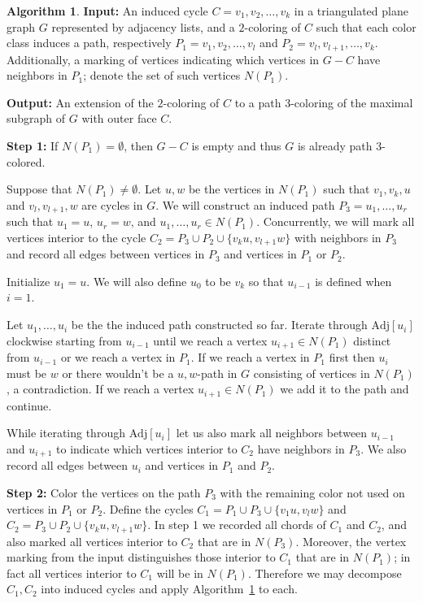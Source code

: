 \documentclass[12pt,letterpaper]{article}
\theoremstyle{plain}
\theoremstyle{definition}
\theoremstyle{break}
\newtheorem{algorithm}[lemma]{Algorithm}     %
\begin{document}
\begin{algorithm}\label{A:poh_linear}
\textbf{Input:} An induced cycle $C=v_1,v_2,\ldots,v_k$ in a triangulated plane
graph $G$ represented by adjacency lists, and a $2$-coloring of $C$ such
that each color class induces a path, respectively $P_1=v_1,v_2,\ldots,v_l$ and
$P_2=v_l,v_{l+1},\ldots,v_k$. Additionally, a marking of vertices indicating which
vertices in $G-C$ have neighbors in $P_1$; denote the set of such vertices
$N(P_1)$.

\noindent\textbf{Output:} An extension of the $2$-coloring of $C$ to a path
$3$-coloring of the maximal subgraph of $G$ with outer face $C$.

\noindent\textbf{Step 1:} If $N(P_1)=\emptyset$, then $G-C$ is empty and thus $G$ is
already path $3$-colored.
    
Suppose that $N(P_1)\ne\emptyset$. Let $u,w$ be the vertices in $N(P_1)$ such that $v_1, v_k, u$
and $v_l,v_{l+1}, w$ are
cycles in $G$. We will construct
an induced path $P_3=u_1,\ldots,u_r$ such that $u_1=u$, $u_r=w$, and $u_1,\ldots,u_r\in
N(P_1)$. Concurrently, we will
mark all vertices interior to the cycle $C_2=P_3\cup P_2\cup\{v_ku,v_{l+1}w\}$
with neighbors in $P_3$ and record all
edges between vertices in $P_3$ and vertices in $P_1$ or $P_2$.

Initialize $u_1=u$. We will also define $u_0$ to be $v_k$ so that
$u_{i-1}$ is defined when $i=1$.

Let $u_1,\ldots,u_i$ be the the induced path constructed so far. Iterate
through $\text{Adj}[u_i]$ clockwise starting from $u_{i-1}$ until we reach a
vertex $u_{i+1}\in N(P_1)$ distinct from $u_{i-1}$ or we reach a vertex in $P_1$. If
we reach a vertex in $P_1$ first then $u_i$ must be $w$ or there wouldn't be a
$u,w$-path in $G$ consisting of vertices in $N(P_1)$, a contradiction. If we reach a
vertex $u_{i+1}\in N(P_1)$ we add it to the path and continue.
    
While iterating
through $\text{Adj}[u_i]$ let us also mark all neighbors between $u_{i-1}$ and
$u_{i+1}$ to indicate which vertices interior to $C_2$ have neighbors in $P_3$.
We also record all edges between $u_i$ and vertices in $P_1$ and $P_2$.

\noindent\textbf{Step 2:} Color the vertices on the path $P_3$ with the
remaining color not used on vertices in $P_1$ or $P_2$. Define the cycles
$C_1=P_1\cup P_3\cup\{v_1u,v_lw\}$ and $C_2=P_3\cup
P_2\cup\{v_ku,v_{l+1}w\}$. In step 1 we recorded all chords of $C_1$ and
$C_2$, and also marked all vertices interior to $C_2$ that are in $N(P_3)$.
Moreover, the vertex marking from the input distinguishes those
interior to $C_1$ that are in $N(P_1)$; in fact all vertices interior to $C_1$ will be in
$N(P_1)$. 
Therefore we may decompose $C_1,C_2$ into induced cycles and apply
Algorithm~\ref{A:poh_linear} to each.
\end{algorithm}
\end{document}
